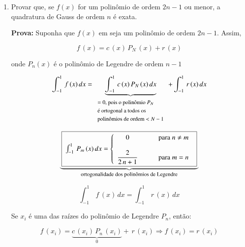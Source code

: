 \begin{enumerate}
\begin{example}
\end{example}

\item
Provar que, se $f(x)$ for um polinômio de ordem $2n-1$ ou menor, a quadratura de Gauss de ordem $n$ é exata.

\textbf{Prova:} Suponha que $f(x)$ em  seja um polinômio de ordem $2n-1$. Assim,

\begin{equation}
 \label{cap2:sec6:eq1}
 f\,(x) = c\,(x) \, P_N\,(x) + r\,(x)
\end{equation}

onde $P_{n}(x)$ é o polinômio de Legendre de ordem $n-1$

\begin{equation}
 \label{cap2:sec6:eq2}
 \int_{-1}^1 \, f\,(x)\,dx = \underbrace{\int_{-1}^1 \, c\,(x)\,P_N\,(x)\,dx}_{
  \begin{array}{l}
   \mbox{\footnotesize{$= 0$, pois o polinômio $P_N$}} \\
   \mbox{\footnotesize{é ortogonal a todos os}} \\
   \mbox{\footnotesize{polinômios de ordem $< N-1$}}
  \end{array}
 } + \int_{-1}^1 \, r\,(x)\,dx
\end{equation}

\begin{equation}
 \underbrace{
 \quadricular{
 \label{cap2:sec6:eq3}
 \int_{-1}^1 \, P_m \, (x) \, dx =
 \left\{
  \begin{array}{cl}
   0 & \qquad \mbox{para } n \neq m \\ \\
   \displaystyle \frac{2}{2\,n+1} & \qquad \mbox{para } m = n
  \end{array}
 \right.
 }
 }_{
  \mbox{\footnotesize{ortogonalidade dos polinômios de Legendre}}
 }
\end{equation}

\begin{equation}
 \label{cap2:sec6:eq4}
 \int_{-1}^1 \, f\,(x) \, dx = \int_{-1}^1 \, r\,(x) \, dx 
\end{equation}

Se $x_{i}$ é uma das raízes do polinômio de Legendre $P_{n}$, então:

\begin{equation}
 \label{cap2:sec6:eq5}
 f\,(x_i) = \underbrace{c\,(x_i) \, P_n\,(x_i)}_{0} + \, r\,(x_i) \Rightarrow f\,(x_i) = r\,(x_i)
\end{equation}


\end{enumerate}
